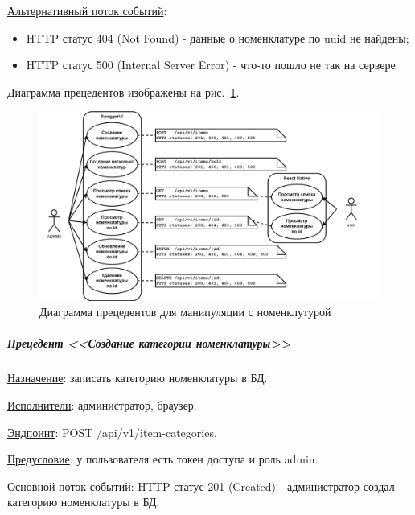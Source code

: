 \underline{Альтернативный поток событий}:

\begin{itemize}
    \item HTTP статус 404 (Not Found) - данные о номенклатуре по uuid не найдены;
    \item HTTP статус 500 (Internal Server Error) - что-то пошло не так на сервере.
\end{itemize}

Диаграмма прецедентов изображены на рис.~\ref{fig:UML_precedent_items}.


\begin{figure}[!htb]
    \centering

    \includegraphics[width=17cm]
    {images/UML/UML_precedent_items.png}

    \caption{Диаграмма прецедентов для манипуляции с номенклутурой}

    \label{fig:UML_precedent_items}
\end{figure}


\subparagraph{Прецедент <<Создание категории номенклатуры>>} \hspace{0pt}

\underline{Назначение}: записать категорию номенклатуры в БД.

\underline{Исполнители}: администратор, браузер.

\underline{Эндпоинт}: POST /api/v1/item-categories.

\underline{Предусловие}: у пользователя есть токен доступа и роль admin.

\underline{Основной поток событий}: HTTP статус 201 (Created) - администратор создал категорию номенклатуры в БД. 

